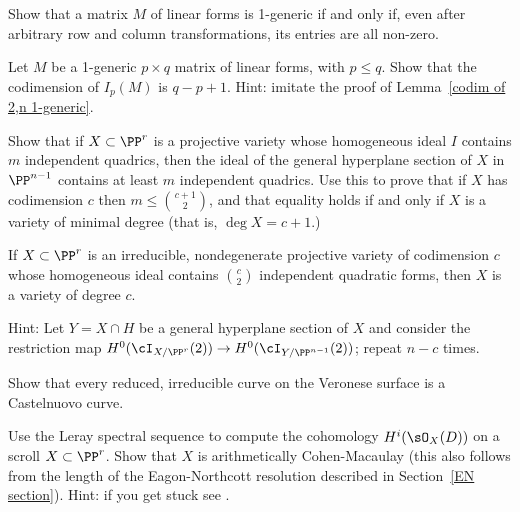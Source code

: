 \begin{exercise}
Show that a matrix $M$ of linear forms is 1-generic if and only if, even after arbitrary row and column transformations, its entries are all non-zero.
\end{exercise}

\begin{exercise}
Let $M$ be a 1-generic $p\times q$ matrix of linear forms, with $p\leq q$. Show that the codimension of
$I_p(M)$ is $q-p+1$. Hint: imitate the proof of Lemma~\ref{codim of 2,n 1-generic}.
\end{exercise}

\begin{exercise}
Show that if $X\subset \PP^r$ is a projective variety whose homogeneous ideal $I$ contains $m$ independent quadrics, then the ideal of the general hyperplane section of $X$ in $\PP^{n-1}$
contains at least $m$ independent quadrics. Use this to prove that if $X$ has codimension $c$ then $m\leq {c+1\choose 2}$, and that equality holds if and only if
$X$ is a variety of minimal degree (that is, $\deg X = c+1$.)
\end{exercise}

\begin{exercise}\label{many quadrics}
 If $X \subset \PP^r$ is an irreducible, nondegenerate projective variety of codimension $c$ whose homogeneous ideal
 contains ${c\choose 2}$ independent quadratic forms, then $X$ is a variety of degree $c$.
 
Hint: Let $Y = X \cap H$ be a general hyperplane section of $X$ and consider the restriction map $H^0(\cI_{X/\PP^r}(2)) \to H^0(\cI_{Y/\PP^{n-1}}(2))$; repeat $n-c$ times.
\end{exercise}

\begin{exercise}\label{Castelnuovo Veronese}
Show that every reduced, irreducible curve on the Veronese surface is a Castelnuovo curve.
\end{exercise}

\begin{exercise}\label{cohomology of invertible sheaves on a scroll}
Use the Leray spectral sequence to compute the cohomology $H^{i}(\sO_{X}(D))$ on a scroll $X\subset \PP^r$.
Show that $X$ is arithmetically Cohen-Macaulay (this also follows from the length of the Eagon-Northcott resolution
described in Section~\ref{EN section}).
Hint: if you get stuck see \cite[Section V.1]{Hartshorne1977}.
\end{exercise}


